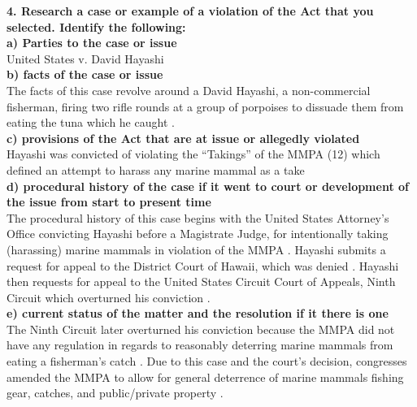 \documentclass[12pt]{article}
\begin{document}
\textbf{4. Research a case or example of a violation of the Act that you selected. Identify the following:} \\

\textbf{a) Parties to the case or issue} \\

United States v. David Hayashi \\

\textbf{b) facts of the case or issue} \\

The facts of this case revolve around a David Hayashi, a non-commercial fisherman, firing two rifle rounds at a group of porpoises to dissuade them from eating the tuna which he caught \cite{PaceLawReview}. \\

\textbf{c) provisions of the Act that are at issue or allegedly violated}\\

Hayashi was convicted of violating the ``Takings'' of the MMPA (12) which defined an attempt to harass any marine mammal as a take \cite{PaceLawReview} \\

\textbf{d) procedural history of the case if it went to court or development of the issue from start to present time} \\

The procedural history of this case begins with the United States Attorney's Office convicting Hayashi before a Magistrate Judge, for intentionally taking (harassing) marine mammals in violation of the MMPA \cite{PaceLawReview}. Hayashi submits a request for appeal to the District Court of Hawaii, which was denied \cite{PaceLawReview}. Hayashi then requests for appeal to the United States Circuit Court of Appeals, Ninth Circuit which overturned his conviction \cite{PaceLawReview}. \\

\textbf{e) current status of the matter and the resolution if it there is one} \\

The Ninth Circuit later overturned his conviction because the MMPA did not have any regulation in regards to reasonably deterring marine mammals from eating a fisherman's catch \cite{PaceLawReview}. Due to this case and the court's decision, congresses amended the MMPA to allow for general deterrence of marine mammals fishing gear, catches, and public/private property \cite{PaceLawReview}.\\
\end{document}
